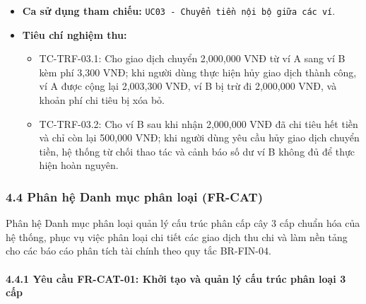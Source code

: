 \documentclass[11pt,a4paper]{article}
\providecommand{\tightlist}{
  \setlength{\itemsep}{0pt}\setlength{\parskip}{0pt}}
\begin{document}
\begin{itemize}
  \begin{itemize}
  \tightlist
  \item
    Trạng thái giao dịch chuyển tiền được cập nhật thành đã hủy.
  \item
    Số dư của hai ví đối ứng được hoàn nguyên chính xác về mức trước khi
    chuyển tiền.
  \item
    Thông báo hủy chuyển tiền thành công.
  \end{itemize}
\item
  \textbf{Ca sử dụng tham chiếu:}
  \texttt{UC03\ -\ Chuyển\ tiền\ nội\ bộ\ giữa\ các\ ví}.
\item
  \textbf{Tiêu chí nghiệm thu:}

  \begin{itemize}
  \tightlist
  \item
    TC-TRF-03.1: Cho giao dịch chuyển 2,000,000 VNĐ từ ví A sang ví B
    kèm phí 3,300 VNĐ; khi người dùng thực hiện hủy giao dịch thành
    công, ví A được cộng lại 2,003,300 VNĐ, ví B bị trừ đi 2,000,000
    VNĐ, và khoản phí chi tiêu bị xóa bỏ.
  \item
    TC-TRF-03.2: Cho ví B sau khi nhận 2,000,000 VNĐ đã chi tiêu hết
    tiền và chỉ còn lại 500,000 VNĐ; khi người dùng yêu cầu hủy giao
    dịch chuyển tiền, hệ thống từ chối thao tác và cảnh báo số dư ví B
    không đủ để thực hiện hoàn nguyên.
  \end{itemize}
\end{itemize}

\newpage

\subsubsection{4.4 Phân hệ Danh mục phân loại
(FR-CAT)}\label{44-phuxe2n-hux1ec7-danh-mux1ee5c-phuxe2n-loux1ea1i-fr-cat}

Phân hệ Danh mục phân loại quản lý cấu trúc phân cấp cây 3 cấp chuẩn hóa
của hệ thống, phục vụ việc phân loại chi tiết các giao dịch thu chi và
làm nền tảng cho các báo cáo phân tích tài chính theo quy tắc BR-FIN-04.

\paragraph{4.4.1 Yêu cầu FR-CAT-01: Khởi tạo và quản lý cấu trúc phân
loại 3
cấp}\label{441-yuxeau-cux1ea7u-fr-cat-01-khux1edfi-tux1ea1o-vuxe0-quux1ea3n-luxfd-cux1ea5u-truxfac-phuxe2n-loux1ea1i-3-cux1ea5p}
\end{document}
